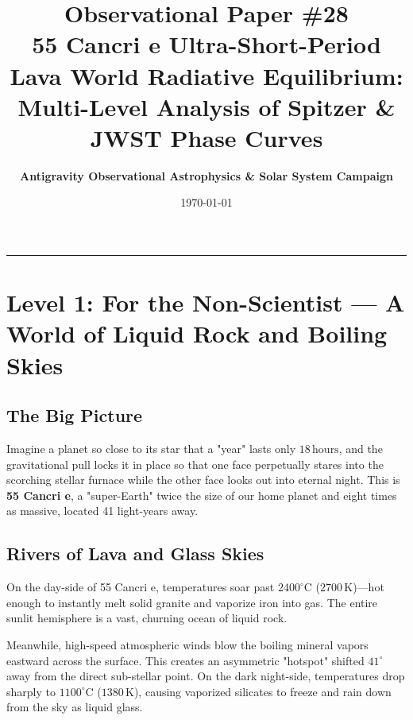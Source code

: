 \documentclass[11pt,a4paper]{article}
\title{\Huge \textbf{Observational Paper \#28}\\ \Large 55 Cancri e Ultra-Short-Period Lava World Radiative Equilibrium: Multi-Level Analysis of Spitzer \& JWST Phase Curves}
\author{\textbf{Antigravity Observational Astrophysics \& Solar System Campaign}}
\date{\today}
\begin{document}
\maketitle

\vspace{-1em}
\begin{center}
\rule{\textwidth}{1.5pt}
\end{center}

\section*{Level 1: For the Non-Scientist — A World of Liquid Rock and Boiling Skies}

\subsection*{The Big Picture}
Imagine a planet so close to its star that a "year" lasts only $18\,\text{hours}$, and the gravitational pull locks it in place so that one face perpetually stares into the scorching stellar furnace while the other face looks out into eternal night. This is \textbf{55 Cancri e}, a "super-Earth" twice the size of our home planet and eight times as massive, located 41 light-years away.

\subsection*{Rivers of Lava and Glass Skies}
On the day-side of 55 Cancri e, temperatures soar past $2400^\circ\text{C}$ ($2700\,\text{K}$)—hot enough to instantly melt solid granite and vaporize iron into gas. The entire sunlit hemisphere is a vast, churning ocean of liquid rock. 

Meanwhile, high-speed atmospheric winds blow the boiling mineral vapors eastward across the surface. This creates an asymmetric "hotspot" shifted $41^\circ$ away from the direct sub-stellar point. On the dark night-side, temperatures drop sharply to $1100^\circ\text{C}$ ($1380\,\text{K}$), causing vaporized silicates to freeze and rain down from the sky as liquid glass.

\newpage

\end{document}
